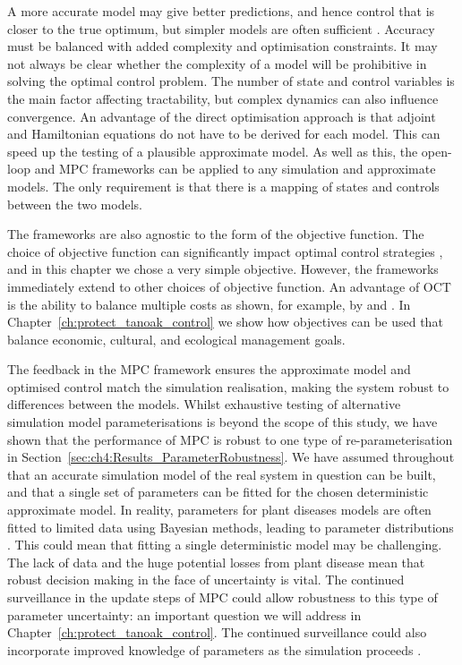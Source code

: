A more accurate model may give better predictions, and hence control that is closer to the true optimum, but simpler models are often sufficient \citep{thompson_effect_2018}. Accuracy must be balanced with added complexity and optimisation constraints. It may not always be clear whether the complexity of a model will be prohibitive in solving the optimal control problem. The number of state and control variables is the main factor affecting tractability, but complex dynamics can also influence convergence. An advantage of the direct optimisation approach is that adjoint and Hamiltonian equations do not have to be derived for each model. This can speed up the testing of a plausible approximate model. As well as this, the open-loop and MPC frameworks can be applied to any simulation and approximate models. The only requirement is that there is a mapping of states and controls between the two models. 

The frameworks are also agnostic to the form of the objective function. The choice of objective function can significantly impact optimal control strategies \citep{probert_decision_2016}, and in this chapter we chose a very simple objective. However, the frameworks immediately extend to other choices of objective function. An advantage of OCT is the ability to balance multiple costs as shown, for example, by \citet{brown_role_2011} and \citet{bokil_optimal_2019}. In Chapter~\ref{ch:protect_tanoak_control} we show how objectives can be used that balance economic, cultural, and ecological management goals.

The feedback in the MPC framework ensures the approximate model and optimised control match the simulation realisation, making the system robust to differences between the models. Whilst exhaustive testing of alternative simulation model parameterisations is beyond the scope of this study, we have shown that the performance of MPC is robust to one type of re-parameterisation in Section~\ref{sec:ch4:Results_ParameterRobustness}. We have assumed throughout that an accurate simulation model of the real system in question can be built, and that a single set of parameters can be fitted for the chosen deterministic approximate model. In reality, parameters for plant diseases models are often fitted to limited data using Bayesian methods, leading to parameter distributions \citep[e.g.][]{kleczkowski_parameter_2007, parry_bayesian_2014}. This could mean that fitting a single deterministic model may be challenging. The lack of data and the huge potential losses from plant disease \citep{savary_global_2019} mean that robust decision making in the face of uncertainty is vital. The continued surveillance in the update steps of MPC could allow robustness to this type of parameter uncertainty: an important question we will address in Chapter~\ref{ch:protect_tanoak_control}. The continued surveillance could also incorporate improved knowledge of parameters as the simulation proceeds \citep{thompson_control_2018}.

